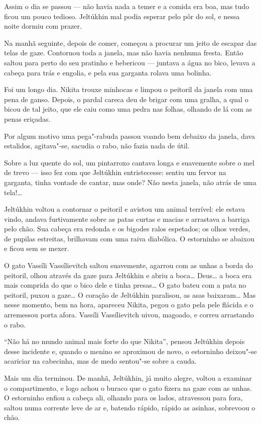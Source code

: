 Assim o dia se passou --- não havia nada a temer e a comida era boa, mas
tudo ficou um pouco tedioso. Jeltúkhin mal podia esperar pelo pôr do
sol, e nessa noite dormiu com prazer.

Na manhã seguinte, depois de comer, começou a procurar um jeito de
escapar das telas de gaze. Contornou toda a janela, mas não havia
nenhuma fresta. Então saltou para perto do seu pratinho e bebericou ---
juntava a água no bico, levava a cabeça para trás e engolia, e pela sua
garganta rolava uma bolinha.

Foi um longo dia. Nikita trouxe minhocas e limpou o peitoril da janela
com uma pena de ganso. Depois, o pardal careca deu de brigar com uma
gralha, a qual o bicou de tal jeito, que ele caiu como uma pedra nas folhas,
olhando de lá com as penas eriçadas.

Por algum motivo uma pega"-rabuda passou voando bem debaixo da janela,
dava estalidos, agitava"-se, sacudia o rabo, não fazia nada de útil.

Sobre a luz quente do sol, um pintarroxo cantava longa e suavemente
sobre o mel de trevo --- isso fez com que Jeltúkhin entristecesse:
sentiu um fervor na garganta, tinha vontade de cantar, mas onde? Não
nesta janela, não atrás de uma tela!\ldots{}

Jeltúkhin voltou a contornar o peitoril e avistou um animal terrível:
ele estava vindo, andava furtivamente sobre as patas curtas e macias e
arrastava a barriga pelo chão. Sua cabeça era redonda e os bigodes ralos
espetados; os olhos verdes, de pupilas estreitas, brilhavam com uma
raiva diabólica. O estorninho se abaixou e ficou sem se mexer.

O gato Vassíli Vassílievitch saltou suavemente, agarrou com as unhas a
borda do peitoril, olhou através da gaze para Jeltúkhin e abriu a
boca\ldots{} Deus\ldots{} a boca era mais comprida do que o bico dele e tinha
presas\ldots{} O gato bateu com a pata no peitoril, puxou a gaze\ldots{} O coração
de Jeltúkhin paralisou, as asas baixaram\ldots{} Mas nesse momento, bem na
hora, apareceu Nikita, pegou o gato pela pele flácida e o arremessou
porta afora. Vassíli Vassílievitch uivou, magoado, e correu arrastando o
rabo.

``Não há no mundo animal mais forte do que Nikita'', pensou Jeltúkhin
depois desse incidente e, quando o menino se aproximou de novo, o estorninho deixou"-se
acariciar na cabecinha, mas de medo sentou"-se sobre a cauda.

Mais um dia terminou. De manhã, Jeltúkhin, já muito alegre, voltou a
examinar o compartimento, e logo achou o buraco que o gato fizera na
gaze com as unhas. O estorninho enfiou a cabeça ali, olhando para os
lados, atravessou para fora, saltou numa corrente leve de ar e, batendo
rápido, rápido as asinhas, sobrevoou o chão.

